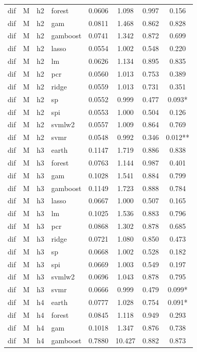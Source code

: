 \begin{ThreePartTable}
\begin{longtable}[t]{llclcccc}
dif & M & h2 & forest & 0.0606 & 1.098 & 0.997 & 0.156\\
dif & M & h2 & gam & 0.0811 & 1.468 & 0.862 & 0.828\\
dif & M & h2 & gamboost & 0.0741 & 1.342 & 0.872 & 0.699\\
dif & M & h2 & lasso & 0.0554 & 1.002 & 0.548 & 0.220\\
dif & M & h2 & lm & 0.0626 & 1.134 & 0.895 & 0.835\\
dif & M & h2 & pcr & 0.0560 & 1.013 & 0.753 & 0.389\\
dif & M & h2 & ridge & 0.0559 & 1.013 & 0.731 & 0.351\\
dif & M & h2 & sp & 0.0552 & 0.999 & 0.477 & 0.093*\\
dif & M & h2 & spi & 0.0553 & 1.000 & 0.504 & 0.126\\
dif & M & h2 & svmlw2 & 0.0557 & 1.009 & 0.864 & 0.769\\
dif & M & h2 & svmr & 0.0548 & 0.992 & 0.346 & 0.012**\\
\addlinespace
dif & M & h3 & earth & 0.1147 & 1.719 & 0.886 & 0.838\\
dif & M & h3 & forest & 0.0763 & 1.144 & 0.987 & 0.401\\
dif & M & h3 & gam & 0.1028 & 1.541 & 0.884 & 0.799\\
dif & M & h3 & gamboost & 0.1149 & 1.723 & 0.888 & 0.784\\
dif & M & h3 & lasso & 0.0667 & 1.000 & 0.507 & 0.165\\
dif & M & h3 & lm & 0.1025 & 1.536 & 0.883 & 0.796\\
dif & M & h3 & pcr & 0.0868 & 1.302 & 0.878 & 0.685\\
dif & M & h3 & ridge & 0.0721 & 1.080 & 0.850 & 0.473\\
dif & M & h3 & sp & 0.0668 & 1.002 & 0.528 & 0.182\\
dif & M & h3 & spi & 0.0669 & 1.003 & 0.549 & 0.197\\
dif & M & h3 & svmlw2 & 0.0696 & 1.043 & 0.878 & 0.795\\
dif & M & h3 & svmr & 0.0666 & 0.999 & 0.479 & 0.099*\\
\addlinespace
dif & M & h4 & earth & 0.0777 & 1.028 & 0.754 & 0.091*\\
dif & M & h4 & forest & 0.0845 & 1.118 & 0.949 & 0.293\\
dif & M & h4 & gam & 0.1018 & 1.347 & 0.876 & 0.738\\
dif & M & h4 & gamboost & 0.7880 & 10.427 & 0.882 & 0.873\\

\end{longtable}
\end{ThreePartTable}
